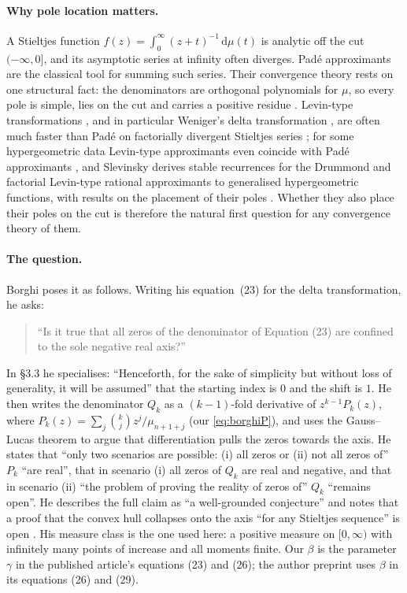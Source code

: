 \documentclass[11pt,a4paper]{article}
\theoremstyle{definition}
\theoremstyle{remark}
\newcommand{\dd}{\,\mathrm{d}}
\begin{document}
\paragraph{Why pole location matters.}
A Stieltjes function $f(z)=\int_0^\infty(z+t)^{-1}\dd\mu(t)$ is analytic
off the cut $(-\infty,0]$, and its asymptotic series at infinity often
diverges. Padé approximants are the classical tool for summing such
series. Their convergence theory rests on one structural fact: the
denominators are orthogonal polynomials for $\mu$, so every pole is simple,
lies on the cut and carries a positive residue \cite[Ch.~5]{BakerGM1996}.
Levin-type transformations \cite{Levin1973,Weniger1989,Sidi2003,
BrezinskiRZ1991,Homeier2000}, and in particular Weniger's delta
transformation \cite{Weniger1989}, are often much faster than Padé on
factorially divergent Stieltjes series \cite{BorghiWeniger2015}; for
some hypergeometric data Levin-type approximants even coincide with Padé
approximants \cite{Sidi1981}, and Slevinsky derives stable recurrences for
the Drummond and factorial Levin-type rational approximants to generalised
hypergeometric functions, with results on the placement of their poles
\cite{Slevinsky2025}. Whether
they also place their poles on the cut is therefore the natural first
question for any convergence theory of them.

\paragraph{The question.}
Borghi \cite[\S3.1]{Borghi2026} poses it as follows. Writing his
equation~(23) for the delta transformation, he asks:
\begin{quote}
``Is it true that all zeros of the denominator of Equation (23) are
confined to the sole negative real axis?''
\end{quote}
In \S3.3 he specialises: ``Henceforth, for the sake of simplicity but
without loss of generality, it will be assumed'' that the starting index is
$0$ and the shift is $1$. He then writes the denominator $Q_k$ as a
$(k-1)$-fold derivative of $z^{k-1}P_k(z)$, where
$P_k(z)=\sum_j\binom kj z^j/\mu_{n+1+j}$ (our \eqref{eq:borghiP}), and uses
the Gauss--Lucas theorem to argue that differentiation pulls the zeros
towards the axis. He states that ``only two scenarios are possible: (i)
all zeros or (ii) not all zeros of'' $P_k$ ``are real'', that in scenario
(i) all zeros of $Q_k$ are real and negative, and that in scenario (ii)
``the problem of proving the reality of zeros of'' $Q_k$ ``remains open''.
He describes the full claim as ``a well-grounded conjecture'' and notes
that a proof that the convex hull collapses onto the axis ``for any
Stieltjes sequence'' is open \cite[\S3.3]{Borghi2026}. His measure class is
the one used here: a positive measure on $[0,\infty)$ with infinitely many
points of increase and all moments finite. Our $\beta$ is the parameter
$\gamma$ in the published article's equations (23) and (26); the author
preprint uses $\beta$ in its equations (26) and (29).
\end{document}
